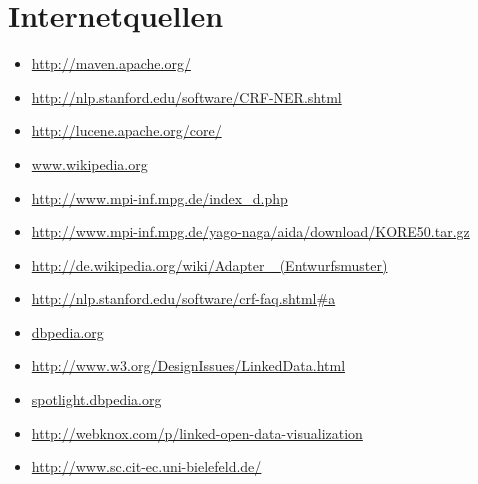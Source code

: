 \documentclass[11pt, a4paper, oneside]{Thesis} %
\begin{document}





\backmatter


\label{Quellen}





\section*{Internetquellen}
\begin{itemize}
\item \url{http://maven.apache.org/}
\item \url{http://nlp.stanford.edu/software/CRF-NER.shtml}
\item \url{http://lucene.apache.org/core/}
\item \url{www.wikipedia.org}
\item \url{http://www.mpi-inf.mpg.de/index\_d.php}
\item \url{http://www.mpi-inf.mpg.de/yago-naga/aida/download/KORE50.tar.gz}
\item \url{http://de.wikipedia.org/wiki/Adapter
\_(Entwurfsmuster)}
\item \url{http://nlp.stanford.edu/software/crf-faq.shtml\#a}
\item \url{dbpedia.org}
\item \url{http://www.w3.org/DesignIssues/LinkedData.html}
\item \url{spotlight.dbpedia.org}
\item \url{http://webknox.com/p/linked-open-data-visualization}
\item \url{http://www.sc.cit-ec.uni-bielefeld.de/}
\end{itemize}
\end{document}
